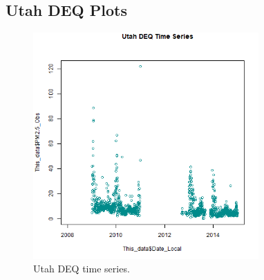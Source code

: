 
\subsection{Utah DEQ Plots}
\begin{figure} 
\centering 
\includegraphics[width=0.77\textwidth]{Code_Outputs/UtahDEQ_time_series.png} 
\caption{\label{fig:UtahDEQTS}Utah DEQ time series.} 
\end{figure} 
 
